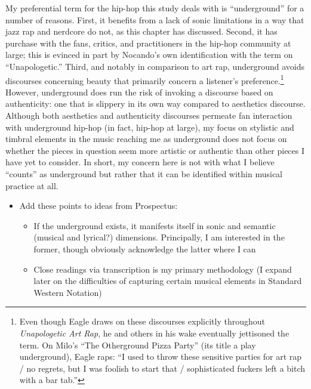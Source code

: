 My preferential term for the hip-hop this study deals with is ``underground'' for a number of reasons. 
First, it benefits from a lack of sonic limitations in a way that jazz rap and nerdcore do not, as this
chapter has discussed. Second, it has purchase with the fans, critics, and practitioners in the hip-hop
community at large; this is evinced in part by Nocando's own identification with the term on ``Unapologetic.''
Third, and notably in comparison to art rap, underground avoids discourses concerning beauty that primarily 
concern a listener's preference.\footnote{
    Even though Eagle draws on these discourses explicitly throughout \textit{Unapologetic Art Rap},
    he and others in his wake eventually jettisoned the term. On Milo's ``The Otherground Pizza Party'' 
    (its title a play underground), Eagle raps: ``I used to throw these sensitive
    parties for art rap / no regrets, but I was foolish to start that / sophisticated fuckers left a
    bitch with a bar tab.''}
However, underground does run the risk of invoking a discourse based on authenticity: one that is
slippery in its own way compared to aesthetics discourse. Although both aesthetics and authenticity
discourses permeate fan interaction with underground hip-hop (in fact, hip-hop at large), my focus
on stylistic and timbral elements in the music reaching me as underground does not focus on whether
the pieces in question seem more artistic or authentic than other pieces I have yet to consider. In
short, my concern here is not with what I believe ``counts'' as underground but rather that it can be
identified within musical practice at all.




\begin{itemize}
    \item Add these points to ideas from Prospectus:
        \begin{itemize}
            \item If the underground exists, it manifests itself in sonic and semantic (musical and lyrical?)
            dimensions. Principally, I am interested in the former, though obviously acknowledge the latter
            where I can
            \item Close readings via transcription is my primary methodology (I expand later on the
            difficulties of capturing certain musical elements in Standard Western Notation)
        \end{itemize}
\end{itemize}

